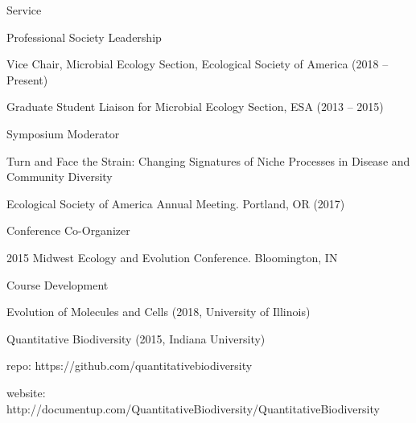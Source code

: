 \documentclass{resume} %
\begin{document}
\begin{rSection}{Service}
    \begin{rSubsection}{Professional Society Leadership}{}{}{}
        \item Vice Chair, Microbial Ecology Section, Ecological Society of America (2018 -- Present)
        \item Graduate Student Liaison for Microbial Ecology Section, ESA (2013 -- 2015)
    \end{rSubsection}


    \begin{rSubsection}{Symposium Moderator}{}{}{}
        \item Turn and Face the Strain: Changing Signatures of Niche
        Processes in Disease and Community Diversity
			\item Ecological Society of America Annual Meeting. Portland, OR (2017)
    \end{rSubsection}

    \begin{rSubsection}{Conference Co-Organizer}{}{}{}
        \item 2015 Midwest Ecology and Evolution Conference.
				Bloomington, IN
    \end{rSubsection}

    \begin{rSubsection}{Course Development}{}{}{}
        \item Evolution of Molecules and Cells (2018, University of Illinois)
        \item Quantitative Biodiversity (2015, Indiana University)
        \item \hspace{2ex} repo: https://github.com/quantitativebiodiversity
        \item \hspace{2ex} website:
        http://documentup.com/QuantitativeBiodiversity/QuantitativeBiodiversity
    \end{rSubsection}

\end{rSection}
\end{document}
